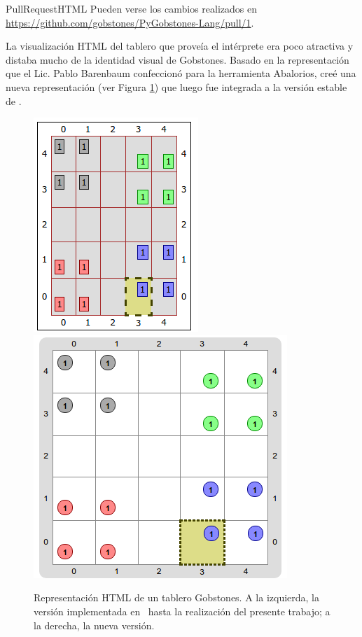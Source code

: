 \sepfootnotecontent
  {PullRequestHTML}
  {Pueden verse los cambios realizados en \url{https://github.com/gobstones/PyGobstones-Lang/pull/1}.}

La visualización HTML del tablero que proveía el intérprete era poco atractiva y distaba mucho de la identidad visual de Gobstones. Basado en la representación que el Lic. Pablo Barenbaum confeccionó para la herramienta Abalorios, creé una nueva representación (ver Figura \ref{fig:TableroHTML}) que luego fue integrada a la versión estable de \pyGob{}.

\begin{figure}
  \centering
  \includegraphics[scale=0.5]{images/tablero-html-viejo.png}
  \includegraphics[scale=0.4]{images/tablero-html-nuevo.png}

  \caption{Representación HTML de un tablero Gobstones. A la izquierda, la versión implementada en \pyGob\ hasta la realización del presente trabajo; a la derecha, la nueva versión.}
  \label{fig:TableroHTML}
\end{figure}

